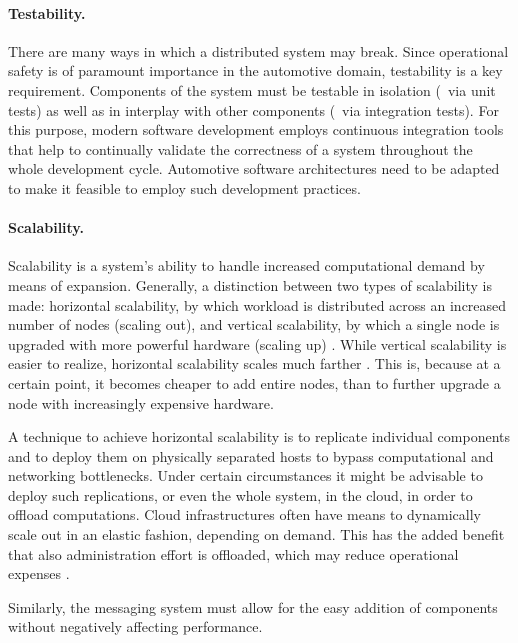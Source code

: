 \paragraph{Testability.}
There are many ways in which a distributed system may break. Since operational safety is of paramount importance in the automotive domain, testability is a key requirement. Components of the system must be testable in isolation (\eg\ via unit tests) as well as in interplay with other components (\eg\ via integration tests). For this purpose, modern software development employs continuous integration tools that help to continually validate the correctness of a system throughout the whole development cycle. Automotive software architectures need to be adapted to make it feasible to employ such development practices.


\paragraph{Scalability.}
Scalability  is a system's ability to handle increased computational demand by means of expansion. Generally, a distinction between two types of scalability is made: horizontal scalability, by which workload is distributed across an increased number of nodes (scaling out), and vertical scalability, by which a single node is upgraded with more powerful hardware (scaling up) \cite{tanenbaum2017distributed}. While vertical scalability is easier to realize, horizontal scalability scales much farther . This is, because at a certain point, it becomes cheaper to add entire nodes, than to further upgrade a node with increasingly expensive hardware.

A technique to achieve horizontal scalability is to replicate individual components and to deploy them on physically separated hosts to bypass computational and networking bottlenecks. Under certain circumstances it might be advisable to deploy such replications, or even the whole system, in the cloud, in order to offload computations. Cloud infrastructures often have means to dynamically scale out in an elastic fashion, depending on demand. This has the added benefit that also administration effort is offloaded, which may reduce operational expenses \cite{vaquero2011dynamically}.

Similarly, the messaging system must allow for the easy addition of components without negatively affecting performance.

%
%
%
%
%
%
%
%
%
%